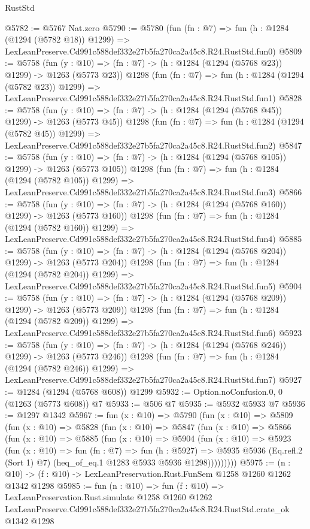 \begin{lexlean}{RustStd}
\begin{coremodule}
@5782 := @5767 Nat.zero
@5790 := @5780
    (fun (fn : @7) =>
    fun (h : @1284 (@1294 (@5782 @18)) @1299) =>
    LexLeanPreserve.Cd991c588def332e27b5fa270ca2a45c8.R24.RustStd.fun0)
@5809 := @5758
    (fun (y : @10) => (fn : @7) -> (h : @1284 (@1294 (@5768 @23)) @1299) -> @1263 (@5773 @23))
    @1298
    (fun (fn : @7) =>
    fun (h : @1284 (@1294 (@5782 @23)) @1299) =>
    LexLeanPreserve.Cd991c588def332e27b5fa270ca2a45c8.R24.RustStd.fun1)
@5828 := @5758
    (fun (y : @10) => (fn : @7) -> (h : @1284 (@1294 (@5768 @45)) @1299) -> @1263 (@5773 @45))
    @1298
    (fun (fn : @7) =>
    fun (h : @1284 (@1294 (@5782 @45)) @1299) =>
    LexLeanPreserve.Cd991c588def332e27b5fa270ca2a45c8.R24.RustStd.fun2)
@5847 := @5758
    (fun (y : @10) => (fn : @7) -> (h : @1284 (@1294 (@5768 @105)) @1299) -> @1263 (@5773 @105))
    @1298
    (fun (fn : @7) =>
    fun (h : @1284 (@1294 (@5782 @105)) @1299) =>
    LexLeanPreserve.Cd991c588def332e27b5fa270ca2a45c8.R24.RustStd.fun3)
@5866 := @5758
    (fun (y : @10) => (fn : @7) -> (h : @1284 (@1294 (@5768 @160)) @1299) -> @1263 (@5773 @160))
    @1298
    (fun (fn : @7) =>
    fun (h : @1284 (@1294 (@5782 @160)) @1299) =>
    LexLeanPreserve.Cd991c588def332e27b5fa270ca2a45c8.R24.RustStd.fun4)
@5885 := @5758
    (fun (y : @10) => (fn : @7) -> (h : @1284 (@1294 (@5768 @204)) @1299) -> @1263 (@5773 @204))
    @1298
    (fun (fn : @7) =>
    fun (h : @1284 (@1294 (@5782 @204)) @1299) =>
    LexLeanPreserve.Cd991c588def332e27b5fa270ca2a45c8.R24.RustStd.fun5)
@5904 := @5758
    (fun (y : @10) => (fn : @7) -> (h : @1284 (@1294 (@5768 @209)) @1299) -> @1263 (@5773 @209))
    @1298
    (fun (fn : @7) =>
    fun (h : @1284 (@1294 (@5782 @209)) @1299) =>
    LexLeanPreserve.Cd991c588def332e27b5fa270ca2a45c8.R24.RustStd.fun6)
@5923 := @5758
    (fun (y : @10) => (fn : @7) -> (h : @1284 (@1294 (@5768 @246)) @1299) -> @1263 (@5773 @246))
    @1298
    (fun (fn : @7) =>
    fun (h : @1284 (@1294 (@5782 @246)) @1299) =>
    LexLeanPreserve.Cd991c588def332e27b5fa270ca2a45c8.R24.RustStd.fun7)
@5927 := @1284 (@1294 (@5768 @608)) @1299
@5932 := Option.noConfusion.{0, 0} (@1263 (@5773 @608)) @7
@5933 := @506 @7
@5935 := @5932 @5933 @7
@5936 := @1297 @1342
@5967 := fun (x : @10) =>
  @5790
    (fun (x : @10) =>
    @5809
      (fun (x : @10) =>
      @5828
        (fun (x : @10) =>
        @5847
          (fun (x : @10) =>
          @5866
            (fun (x : @10) =>
            @5885
              (fun (x : @10) =>
              @5904
                (fun (x : @10) =>
                @5923
                  (fun (x : @10) =>
                  fun (fn : @7) =>
                  fun (h : @5927) =>
                  @5935
                    @5936
                    (Eq.refl.{2} (Sort 1) @7)
                    (heq_of_eq.{1} @1283 @5933 @5936 @1298)))))))))
@5975 := (n : @10) -> (f : @10) -> LexLeanPreservation.Rust.FunSem @1258 @1260 @1262 @1342 @1298
@5985 := fun (n : @10) =>
  fun (f : @10) =>
  LexLeanPreservation.Rust.simulate
    @1258
    @1260
    @1262
    LexLeanPreserve.Cd991c588def332e27b5fa270ca2a45c8.R24.RustStd.crate_ok
    @1342
    @1298
\end{coremodule}
\end{lexlean}
